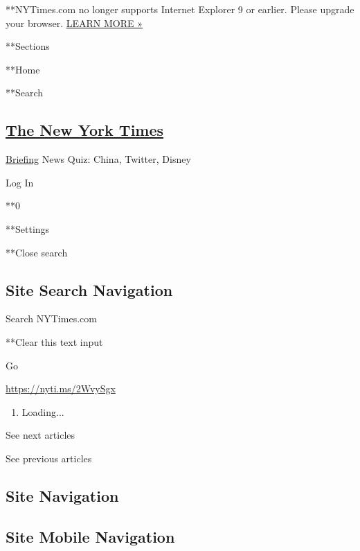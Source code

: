  **NYTimes.com no longer supports Internet Explorer 9 or earlier. Please
upgrade your browser.
\href{http://www.nytimes.com/content/help/site/ie9-support.html}{LEARN
MORE »}

**Sections

**Home

**Search

\hypertarget{the-new-york-times}{%
\subsection{\texorpdfstring{\href{http://www.nytimes.com/}{The New York
Times}}{The New York Times}}\label{the-new-york-times}}


\href{/interactive/2018/briefing/global-morning-briefing-newsletter-signup.html}{Briefing}
\textbar{}News Quiz: China, Twitter, Disney

Log In

**0

**Settings

**Close search

\hypertarget{site-search-navigation}{%
\subsection{Site Search Navigation}\label{site-search-navigation}}

Search NYTimes.com

**Clear this text input

Go

\url{https://nyti.ms/2WvySgx}

\begin{enumerate}
\def\labelenumi{\arabic{enumi}.}
\item
  Loading...
\end{enumerate}

See next articles

See previous articles

\hypertarget{site-navigation}{%
\subsection{Site Navigation}\label{site-navigation}}

\hypertarget{site-mobile-navigation}{%
\subsection{Site Mobile Navigation}\label{site-mobile-navigation}}

